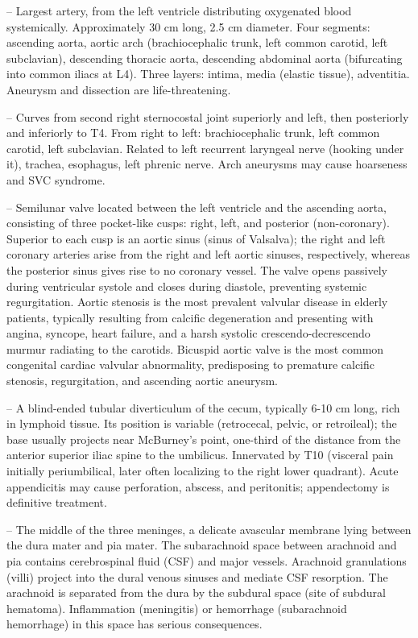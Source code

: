 -- Largest artery, from the left ventricle distributing oxygenated blood systemically. Approximately 30 cm long, 2.5 cm diameter. Four segments: ascending aorta, aortic arch (brachiocephalic trunk, left common carotid, left subclavian), descending thoracic aorta, descending abdominal aorta (bifurcating into common iliacs at L4). Three layers: intima, media (elastic tissue), adventitia. Aneurysm and dissection are life-threatening.

-- Curves from second right sternocostal joint superiorly and left, then posteriorly and inferiorly to T4. From right to left: brachiocephalic trunk, left common carotid, left subclavian. Related to left recurrent laryngeal nerve (hooking under it), trachea, esophagus, left phrenic nerve. Arch aneurysms may cause hoarseness and SVC syndrome.

-- Semilunar valve located between the left ventricle and the ascending aorta, consisting of three pocket-like cusps: right, left, and posterior (non-coronary). Superior to each cusp is an aortic sinus (sinus of Valsalva); the right and left coronary arteries arise from the right and left aortic sinuses, respectively, whereas the posterior sinus gives rise to no coronary vessel. The valve opens passively during ventricular systole and closes during diastole, preventing systemic regurgitation. Aortic stenosis is the most prevalent valvular disease in elderly patients, typically resulting from calcific degeneration and presenting with angina, syncope, heart failure, and a harsh systolic crescendo-decrescendo murmur radiating to the carotids. Bicuspid aortic valve is the most common congenital cardiac valvular abnormality, predisposing to premature calcific stenosis, regurgitation, and ascending aortic aneurysm.

-- A blind-ended tubular diverticulum of the cecum, typically 6-10 cm long, rich in lymphoid tissue. Its position is variable (retrocecal, pelvic, or retroileal); the base usually projects near McBurney's point, one-third of the distance from the anterior superior iliac spine to the umbilicus. Innervated by T10 (visceral pain initially periumbilical, later often localizing to the right lower quadrant). Acute appendicitis may cause perforation, abscess, and peritonitis; appendectomy is definitive treatment.

-- The middle of the three meninges, a delicate avascular membrane lying between the dura mater and pia mater. The subarachnoid space between arachnoid and pia contains cerebrospinal fluid (CSF) and major vessels. Arachnoid granulations (villi) project into the dural venous sinuses and mediate CSF resorption. The arachnoid is separated from the dura by the subdural space (site of subdural hematoma). Inflammation (meningitis) or hemorrhage (subarachnoid hemorrhage) in this space has serious consequences.


